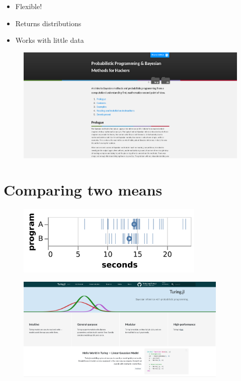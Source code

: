 \documentclass[aspectratio=169,xcolor=svgnames]{beamer}
\begin{document}
\begin{frame}
  \begin{itemize}
  \item Flexible!
  \item Returns distributions
  \item Works with little data
  \end{itemize}
\end{frame}

\begin{frame}
  \begin{figure}[ht]
    \centering
    \includegraphics[width=\textwidth]{figures/bmfh.png}
  \end{figure}
\end{frame}

\section{Comparing two means}

\begin{frame}
  \begin{figure}[ht]
    \centering
    \includegraphics[width=0.8\textwidth]{figures/samples_a_b.pdf}
  \end{figure}
\end{frame}

\begin{frame}
\begin{figure}[ht]
  \centering
  \includegraphics[width=0.9\textwidth]{figures/turingjl.png}
\end{figure}
\end{frame}
\end{document}
